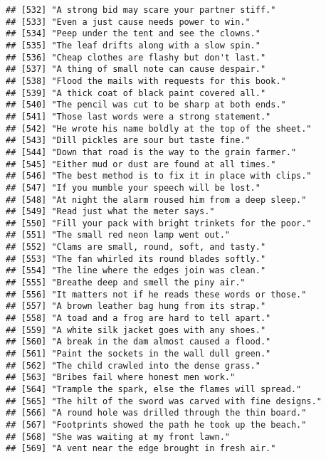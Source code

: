 \documentclass[
]{article}
\begin{document}
\begin{verbatim}
## [532] "A strong bid may scare your partner stiff."               
## [533] "Even a just cause needs power to win."                    
## [534] "Peep under the tent and see the clowns."                  
## [535] "The leaf drifts along with a slow spin."                  
## [536] "Cheap clothes are flashy but don't last."                 
## [537] "A thing of small note can cause despair."                 
## [538] "Flood the mails with requests for this book."             
## [539] "A thick coat of black paint covered all."                 
## [540] "The pencil was cut to be sharp at both ends."             
## [541] "Those last words were a strong statement."                
## [542] "He wrote his name boldly at the top of the sheet."        
## [543] "Dill pickles are sour but taste fine."                    
## [544] "Down that road is the way to the grain farmer."           
## [545] "Either mud or dust are found at all times."               
## [546] "The best method is to fix it in place with clips."        
## [547] "If you mumble your speech will be lost."                  
## [548] "At night the alarm roused him from a deep sleep."         
## [549] "Read just what the meter says."                           
## [550] "Fill your pack with bright trinkets for the poor."        
## [551] "The small red neon lamp went out."                        
## [552] "Clams are small, round, soft, and tasty."                 
## [553] "The fan whirled its round blades softly."                 
## [554] "The line where the edges join was clean."                 
## [555] "Breathe deep and smell the piny air."                     
## [556] "It matters not if he reads these words or those."         
## [557] "A brown leather bag hung from its strap."                 
## [558] "A toad and a frog are hard to tell apart."                
## [559] "A white silk jacket goes with any shoes."                 
## [560] "A break in the dam almost caused a flood."                
## [561] "Paint the sockets in the wall dull green."                
## [562] "The child crawled into the dense grass."                  
## [563] "Bribes fail where honest men work."                       
## [564] "Trample the spark, else the flames will spread."          
## [565] "The hilt of the sword was carved with fine designs."      
## [566] "A round hole was drilled through the thin board."         
## [567] "Footprints showed the path he took up the beach."         
## [568] "She was waiting at my front lawn."                        
## [569] "A vent near the edge brought in fresh air."               

\end{verbatim}
\end{document}
